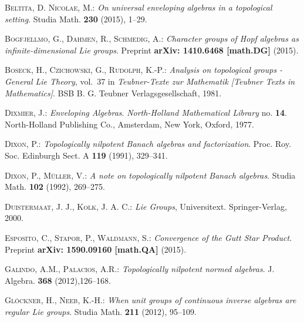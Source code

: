 \documentclass[
11pt,                          %
english                        %
]{article}
\begin{document}
\begin{thebibliography}{1}

\footnotesize
{}
\textsc{Beltita, D. Nicolae, M.: }\newblock \emph{On universal enveloping algebras in 
  a topological setting}.
\newblock Studia Math. \textbf{230} (2015), 1--29.

\textsc{Bogfjellmo, G., Dahmen, R., Schmedig, A.: }\newblock \emph{Character
  groups of Hopf algebras as infinite-dimensional Lie groups}.
\newblock Preprint  \textbf{arXiv: 1410.6468 [math.DG]} (2015).

\textsc{Boseck, H., Czichowski, G., Rudolph, K.-P.: }\newblock \emph{Analysis
  on topological groups - General Lie Theory}, vol.~37 in \emph{Teubner-Texte
  zur Mathematik [Teubner Texts in Mathematics]}.
\newblock BSB B. G. Teubner Verlagsgesellschaft, 1981.

\textsc{Dixmier, J.: }\newblock \emph{Enveloping Algebras}.
\newblock \emph{North-Holland Mathematical Library} no. \textbf{14}.
\newblock North-Holland Publishing Co., Amsterdam, New York, Oxford, 1977.

\textsc{Dixon, P.: }\newblock \emph{Topologically nilpotent Banach algebras and 
factorization}.
\newblock Proc. Roy. Soc. Edinburgh Sect. A \textbf{119} (1991), 329--341.

\textsc{Dixon, P., M\"uller, V.: }\newblock \emph{A note on topologically 
nilpotent Banach algebras}.
\newblock Studia Math. \textbf{102} (1992), 269--275.

\textsc{Duistermaat, J. J., Kolk, J. A. C.: }\newblock \emph{Lie Groups}, Universitext.
\newblock Springer-Verlag, 2000.

\textsc{Esposito, C., Stapor, P., Waldmann, S.: }\newblock \emph{Convergence 
  of the Gutt Star Product}.
\newblock Preprint  \textbf{arXiv: 1590.09160 [math.QA]} (2015).

\textsc{Galindo, A.M., Palacios, A.R.: }\newblock \emph{Topologically nilpotent 
normed algebras}.
\newblock J. Algebra.  \textbf{368} (2012),126--168.

\textsc{Gl{\"o}ckner, H., Neeb, K.-H.: }\newblock \emph{When unit groups of
  continuous inverse algebras are regular Lie groups}.
\newblock Studia Math.  \textbf{211} (2012), 95--109.


\end{thebibliography}
\end{document}
